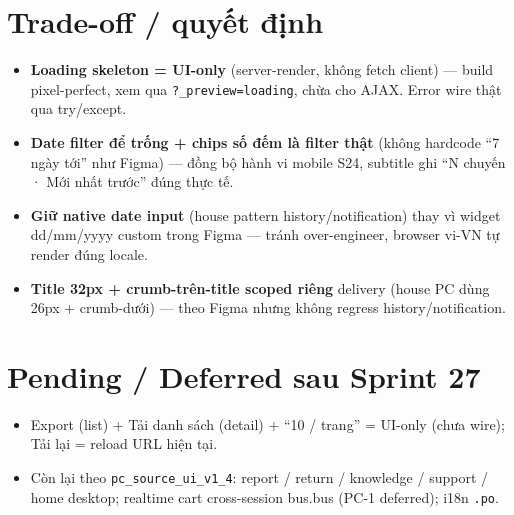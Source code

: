 \section{Trade-off / quyết định}

\begin{itemize}
  \item \textbf{Loading skeleton = UI-only} (server-render, không fetch client) --- build pixel-perfect, xem qua \texttt{?\_preview=loading}, chừa cho AJAX. Error wire thật qua try/except.
  \item \textbf{Date filter để trống + chips số đếm là filter thật} (không hardcode ``7 ngày tới'' như Figma) --- đồng bộ hành vi mobile S24, subtitle ghi ``N chuyến · Mới nhất trước'' đúng thực tế.
  \item \textbf{Giữ native date input} (house pattern history/notification) thay vì widget dd/mm/yyyy custom trong Figma --- tránh over-engineer, browser vi-VN tự render đúng locale.
  \item \textbf{Title 32px + crumb-trên-title scoped riêng} delivery (house PC dùng 26px + crumb-dưới) --- theo Figma nhưng không regress history/notification.
\end{itemize}

\section{Pending / Deferred sau Sprint 27}

\begin{itemize}
  \item Export (list) + Tải danh sách (detail) + ``10 / trang'' = UI-only (chưa wire); Tải lại = reload URL hiện tại.
  \item Còn lại theo \texttt{pc\_source\_ui\_v1\_4}: report / return / knowledge / support / home desktop; realtime cart cross-session bus.bus (PC-1 deferred); i18n \texttt{.po}.
\end{itemize}
